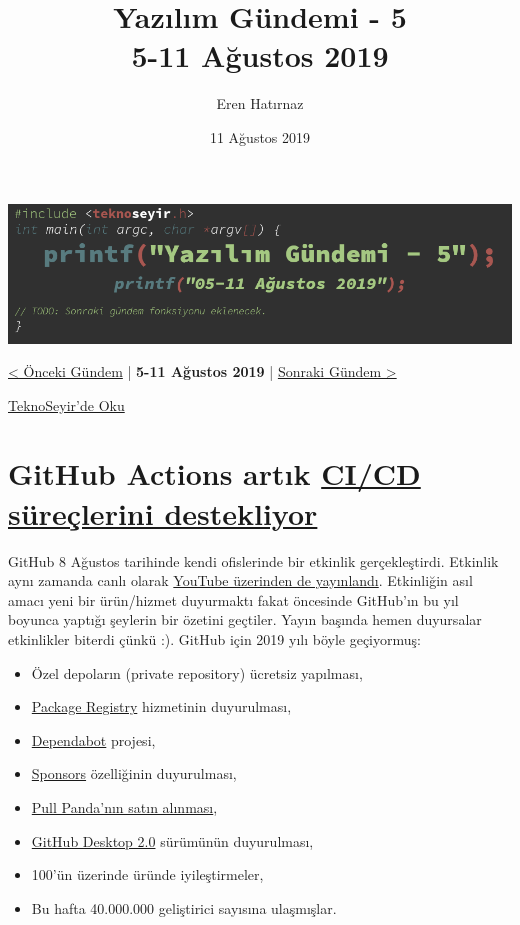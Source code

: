\documentclass[11pt]{article}
\author{Eren Hatırnaz}
\date{11 Ağustos 2019}
\title{Yazılım Gündemi - 5\\\medskip
\large 5-11 Ağustos 2019}
\begin{document}
\maketitle
\tableofcontents \clearpage\shorthandoff{=}

\begin{center}
\includegraphics[width=.9\linewidth]{gorseller/yazilim-gundemi-banner.png}
\end{center}

\begin{center}
\href{../04/yazilim-gundemi-04.pdf}{< Önceki Gündem} | \textbf{5-11 Ağustos 2019} | \href{../06/yazilim-gundemi-06.pdf}{Sonraki Gündem >}

\href{https://teknoseyir.com/blog/yazilim-gundemi-5-05-11-agustos-2019}{TeknoSeyir'de Oku}
\end{center}

\section{GitHub Actions artık \href{https://github.blog/2019-08-08-github-actions-now-supports-ci-cd/}{CI/CD süreçlerini destekliyor}}
\label{sec:org5136d5a}
GitHub 8 Ağustos tarihinde kendi ofislerinde bir etkinlik gerçekleştirdi.
Etkinlik aynı zamanda canlı olarak \href{https://www.youtube.com/watch?v=E1OunoCyuhY}{YouTube üzerinden de yayınlandı}. Etkinliğin
asıl amacı yeni bir ürün/hizmet duyurmaktı fakat öncesinde GitHub'ın bu yıl
boyunca yaptığı şeylerin bir özetini geçtiler. Yayın başında hemen duyursalar
etkinlikler biterdi çünkü :). GitHub için 2019 yılı böyle geçiyormuş:
\begin{itemize}
\item Özel depoların (private repository) ücretsiz yapılması,
\item \href{https://github.com/features/package-registry}{Package Registry} hizmetinin duyurulması,
\item \href{https://github.com/dependabot}{Dependabot} projesi,
\item \href{https://github.com/sponsors}{Sponsors} özelliğinin duyurulması,
\item \href{https://github.blog/2019-06-17-github-acquires-pull-panda/}{Pull Panda'nın satın alınması},
\item \href{https://github.blog/2019-06-17-github-acquires-pull-panda/}{GitHub Desktop 2.0} sürümünün duyurulması,
\item 100'ün üzerinde üründe iyileştirmeler,
\item Bu hafta 40.000.000 geliştirici sayısına ulaşmışlar.
\end{itemize}
\end{document}
